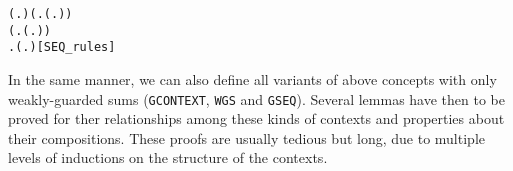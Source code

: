  \begin{alltt}
\HOLTokenTurnstile{}  (\HOLTokenLambda{}. ) \HOLSymConst{\HOLTokenConj{}} (\HOLSymConst{\HOLTokenForall{}}.  (\HOLTokenLambda{}. )) \HOLSymConst{\HOLTokenConj{}}
   (\HOLSymConst{\HOLTokenForall{}} .   \HOLSymConst{\HOLTokenImp{}}  (\HOLTokenLambda{}.  )) \HOLSymConst{\HOLTokenConj{}}
   \HOLSymConst{\HOLTokenForall{}} .   \HOLSymConst{\HOLTokenConj{}}   \HOLSymConst{\HOLTokenImp{}}  (\HOLTokenLambda{}.   \HOLSymConst{+}  )\hfill{[SEQ_rules]}
\end{alltt}

In the same manner, we can also define all
variants of above concepts with only weakly-guarded sums (\texttt{GCONTEXT}, \texttt{WGS} and
\texttt{GSEQ}). Several lemmas have then to be proved for ther
relationships among these kinds of contexts and properties about their
compositions. These proofs are usually tedious but  long,  due to multiple levels of
inductions on the structure of the contexts.%





